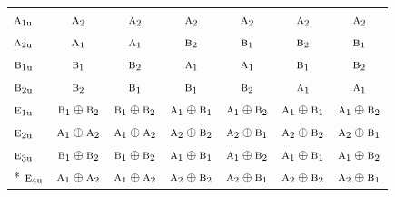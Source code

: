\documentclass[10pt,a4paper]{article}
\numberwithin{equation}{section}
\newcommand{\irr}[1]{\text{\normalfont\scshape #1}}
\newcommand{\ptag}[1]{\mathrm{#1}}
\begin{document}
{\begin{longtable}{@{}lcccccc@{}}
$\irr{a}_{1\ptag{u}}$ & $\irr{a}_{2}$ & $\irr{a}_{2}$ & $\irr{a}_{2}$ & $\irr{a}_{2}$ & $\irr{a}_{2}$ & $\irr{a}_{2}$\\
$\irr{a}_{2\ptag{u}}$ & $\irr{a}_{1}$ & $\irr{a}_{1}$ & $\irr{b}_{2}$ & $\irr{b}_{1}$ & $\irr{b}_{2}$ & $\irr{b}_{1}$\\
$\irr{b}_{1\ptag{u}}$ & $\irr{b}_{1}$ & $\irr{b}_{2}$ & $\irr{a}_{1}$ & $\irr{a}_{1}$ & $\irr{b}_{1}$ & $\irr{b}_{2}$\\
$\irr{b}_{2\ptag{u}}$ & $\irr{b}_{2}$ & $\irr{b}_{1}$ & $\irr{b}_{1}$ & $\irr{b}_{2}$ & $\irr{a}_{1}$ & $\irr{a}_{1}$\\
$\irr{e}_{1\ptag{u}}$ & $\irr{b}_{1}\oplus \irr{b}_{2}$ & $\irr{b}_{1}\oplus \irr{b}_{2}$ & $\irr{a}_{1}\oplus \irr{b}_{1}$ & $\irr{a}_{1}\oplus \irr{b}_{2}$ & $\irr{a}_{1}\oplus \irr{b}_{1}$ & $\irr{a}_{1}\oplus \irr{b}_{2}$\\
$\irr{e}_{2\ptag{u}}$ & $\irr{a}_{1}\oplus \irr{a}_{2}$ & $\irr{a}_{1}\oplus \irr{a}_{2}$ & $\irr{a}_{2}\oplus \irr{b}_{2}$ & $\irr{a}_{2}\oplus \irr{b}_{1}$ & $\irr{a}_{2}\oplus \irr{b}_{2}$ & $\irr{a}_{2}\oplus \irr{b}_{1}$\\
$\irr{e}_{3\ptag{u}}$ & $\irr{b}_{1}\oplus \irr{b}_{2}$ & $\irr{b}_{1}\oplus \irr{b}_{2}$ & $\irr{a}_{1}\oplus \irr{b}_{1}$ & $\irr{a}_{1}\oplus \irr{b}_{2}$ & $\irr{a}_{1}\oplus \irr{b}_{1}$ & $\irr{a}_{1}\oplus \irr{b}_{2}$\\*
$\irr{e}_{4\ptag{u}}$ & $\irr{a}_{1}\oplus \irr{a}_{2}$ & $\irr{a}_{1}\oplus \irr{a}_{2}$ & $\irr{a}_{2}\oplus \irr{b}_{2}$ & $\irr{a}_{2}\oplus \irr{b}_{1}$ & $\irr{a}_{2}\oplus \irr{b}_{2}$ & $\irr{a}_{2}\oplus \irr{b}_{1}$\\
\bottomrule\end{longtable}}
\end{document}
